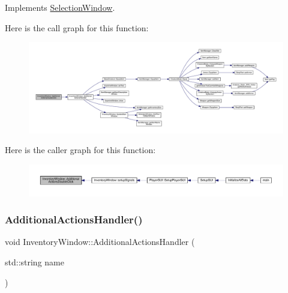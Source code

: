 Implements \mbox{\hyperlink{class_selection_window_a853f6c1c78163cd976d8a7d7bf1a9153}{Selection\+Window}}.

Here is the call graph for this function\+:
\nopagebreak
\begin{figure}[H]
\begin{center}
\leavevmode
\includegraphics[width=350pt]{d1/dee/class_inventory_window_a184239af4739a83163b45c4bb72ff6ec_cgraph}
\end{center}
\end{figure}
Here is the caller graph for this function\+:
\nopagebreak
\begin{figure}[H]
\begin{center}
\leavevmode
\includegraphics[width=350pt]{d1/dee/class_inventory_window_a184239af4739a83163b45c4bb72ff6ec_icgraph}
\end{center}
\end{figure}
\mbox{\label{class_inventory_window_a5115f00fecccca34ba3559079a325a9a}} 
\subsubsection{\texorpdfstring{Additional\+Actions\+Handler()}{AdditionalActionsHandler()}}
{\footnotesize\ttfamily void Inventory\+Window\+::\+Additional\+Actions\+Handler (\begin{DoxyParamCaption}\item[{std\+::string}]{name }\end{DoxyParamCaption})\hspace{0.3cm}{\ttfamily [virtual]}}



